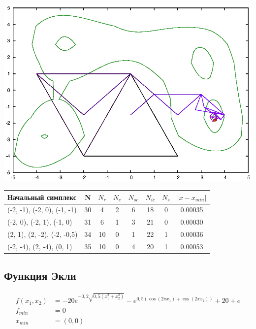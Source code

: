 \documentclass[12pt]{article}
\theoremstyle{plain}
\theoremstyle{remark}
\theoremstyle{definition}
\begin{document}
\includegraphics[scale=0.6]{himmelblau4.eps}

\begin{tabular}{|l| c| c| c| c| c| c| c|}
\hline
  Начальный симплекс &N & $N_r$ & $N_e$ & $N_{oc}$ & $N_{ic}$ & $N_s$ & $\left| x - x_{min} \right|$ \\
\hline
 (-2, -1), (-2, 0), (-1, -1) & 30 & 4 & 2 & 6 & 18 & 0 & 0.00035 \\
(-2, 0), (-2, 1), (-1, 0) & 31  &6 &1 & 3 & 21 &  0 & 0.00030 \\
(2, 1), (2, -2), (-2, -0,5) & 34 & 10 & 0 & 1 & 22 & 1 & 0.00036 \\
(-2, -4), (2, -4), (0, 1) & 35 & 10 & 0 & 4 & 20 & 1& 0.00053 \\
\hline
\end{tabular}

\subsection{Функция Экли}
\vspace{-0.6cm}
\begin{align*}
f(x_1, x_2) &= -20 e ^{-0,2 \sqrt{0,5(x_1^2 + x_2^2)}} - e^{0,5(\cos( 2\pi x_1) + \cos(2 \pi x_2))}+ 20 + e\\
f_{min} &= 0  \\
x_{min} &= (0, 0)
\end{align*}
\end{document}

